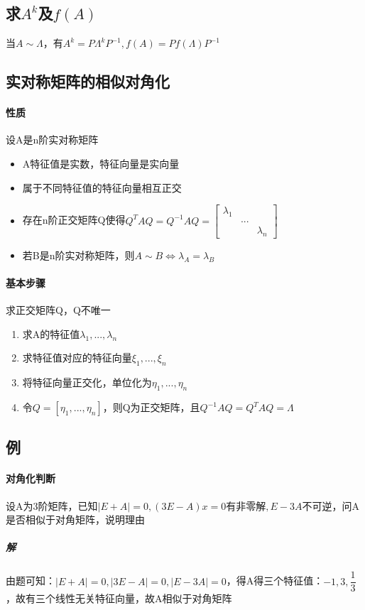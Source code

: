 \subsection{求\(A^k\)及\(f(A)\)}
当\(A \sim \Lambda\)，有\(A^k = P\Lambda^kP^{-1}, f(A) = Pf(\Lambda)P^{-1}\)


\subsection{实对称矩阵的相似对角化}

\paragraph{性质}
设A是n阶实对称矩阵
\begin{itemize}
    \item A特征值是实数，特征向量是实向量
    \item 属于不同特征值的特征向量相互正交
    \item 存在n阶正交矩阵Q使得\(Q^TAQ = Q^{-1}AQ = \begin{bmatrix}
        \lambda_1 & & \\ 
        & ... & \\ 
        & & \lambda_n
    \end{bmatrix}\)
    \item 若B是n阶实对称矩阵，则\(A \sim B \Leftrightarrow \lambda_A = \lambda_B\)
\end{itemize}

\paragraph{基本步骤}
求正交矩阵Q，Q不唯一
\begin{enumerate}
    \item 求A的特征值\(\lambda_1, ..., \lambda_n\)
    \item 求特征值对应的特征向量\(\xi_1, ..., \xi_n\)
    \item 将特征向量正交化，单位化为\(\eta_1, ..., \eta_n\)
    \item 令\(Q = [\eta_1, ..., \eta_n]\)，则Q为正交矩阵，且\(Q^{-1}AQ = Q^TAQ = \Lambda\)
\end{enumerate}



\subsection{例}

\paragraph{对角化判断}
设A为3阶矩阵，已知\(|E + A| = 0, (3E - A)x = 0\text{有非零解}, E - 3A\)不可逆，问A是否相似于对角矩阵，说明理由
\subparagraph{解}
由题可知：\(|E + A| = 0, |3E - A| = 0, |E - 3A| = 0\)，得A得三个特征值：\(-1, 3, \dfrac{1}{3}\)，故有三个线性无关特征向量，故A相似于对角矩阵

